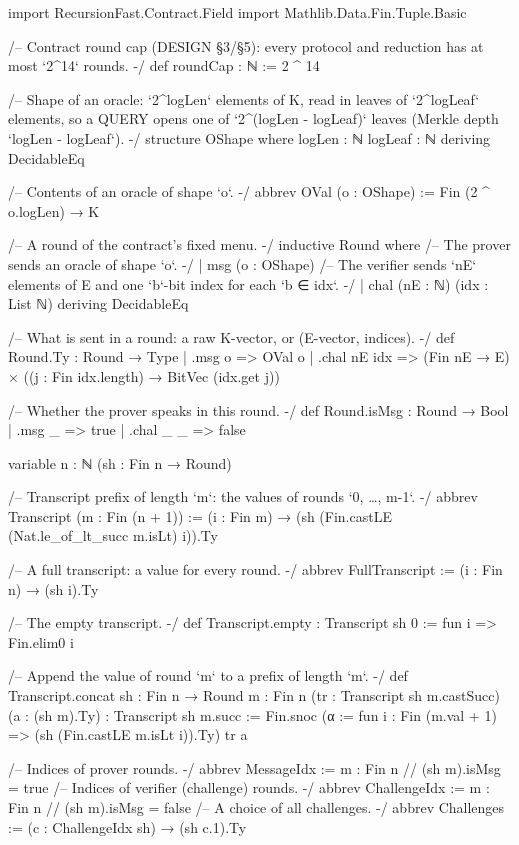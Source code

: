 \begin{leancode}[fontsize=\scriptsize,label={\footnotesize Contract/Shapes.lean}]
import RecursionFast.Contract.Field
import Mathlib.Data.Fin.Tuple.Basic

/-- Contract round cap (DESIGN §3/§5): every protocol and reduction has at most `2^14` rounds. -/
def roundCap : ℕ := 2 ^ 14

/-- Shape of an oracle: `2^logLen` elements of K, read in leaves of `2^logLeaf` elements, so a
QUERY opens one of `2^(logLen - logLeaf)` leaves (Merkle depth `logLen - logLeaf`). -/
structure OShape where
  logLen : ℕ
  logLeaf : ℕ
  deriving DecidableEq

/-- Contents of an oracle of shape `o`. -/
abbrev OVal (o : OShape) := Fin (2 ^ o.logLen) → K

/-- A round of the contract's fixed menu. -/
inductive Round where
  /-- The prover sends an oracle of shape `o`. -/
  | msg (o : OShape)
  /-- The verifier sends `nE` elements of E and one `b`-bit index for each `b ∈ idx`. -/
  | chal (nE : ℕ) (idx : List ℕ)
  deriving DecidableEq

/-- What is sent in a round: a raw K-vector, or (E-vector, indices). -/
def Round.Ty : Round → Type
  | .msg o => OVal o
  | .chal nE idx => (Fin nE → E) × ((j : Fin idx.length) → BitVec (idx.get j))

/-- Whether the prover speaks in this round. -/
def Round.isMsg : Round → Bool
  | .msg _ => true
  | .chal _ _ => false

variable {n : ℕ} (sh : Fin n → Round)

/-- Transcript prefix of length `m`: the values of rounds `0, …, m-1`. -/
abbrev Transcript (m : Fin (n + 1)) := (i : Fin m) → (sh (Fin.castLE (Nat.le_of_lt_succ m.isLt) i)).Ty

/-- A full transcript: a value for every round. -/
abbrev FullTranscript := (i : Fin n) → (sh i).Ty

/-- The empty transcript. -/
def Transcript.empty : Transcript sh 0 := fun i => Fin.elim0 i

/-- Append the value of round `m` to a prefix of length `m`. -/
def Transcript.concat {sh : Fin n → Round} {m : Fin n} (tr : Transcript sh m.castSucc) (a : (sh m).Ty) :
    Transcript sh m.succ :=
  Fin.snoc (α := fun i : Fin (m.val + 1) => (sh (Fin.castLE m.isLt i)).Ty) tr a

/-- Indices of prover rounds. -/
abbrev MessageIdx := {m : Fin n // (sh m).isMsg = true}
/-- Indices of verifier (challenge) rounds. -/
abbrev ChallengeIdx := {m : Fin n // (sh m).isMsg = false}
/-- A choice of all challenges. -/
abbrev Challenges := (c : ChallengeIdx sh) → (sh c.1).Ty


\end{leancode}
